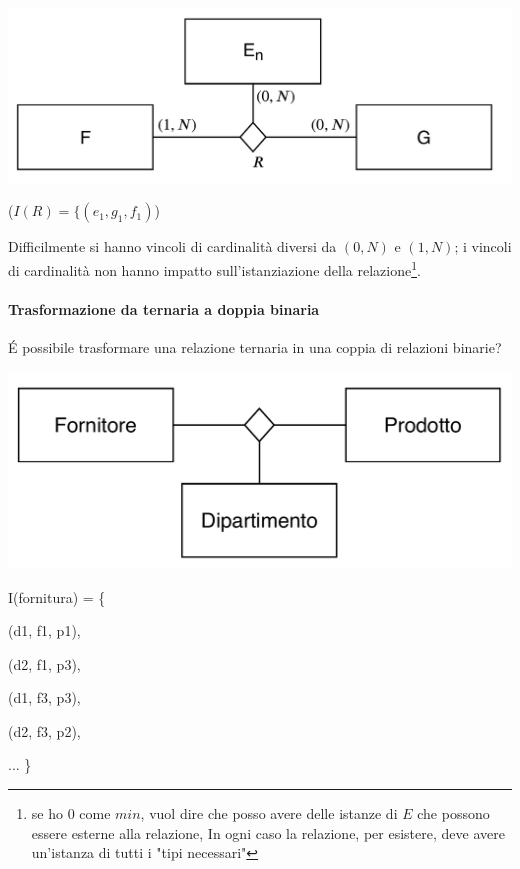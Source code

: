 \documentclass[a4paper, 10pt]{report}
\begin{document}
\begin{center}
\includegraphics[scale=0.5]{21ottobre08.pdf}

($I(R) = \{(e_1, g_1, f_1)$)
\end{center}

\noindent Difficilmente si hanno vincoli di cardinalità diversi da $(0, N)$ e $(1, N)$; i vincoli di cardinalità non hanno impatto sull'istanziazione della relazione\footnote{se ho $0$
come $min$, vuol dire che posso avere delle istanze di $E$ che possono essere esterne alla relazione, In ogni caso la relazione, per esistere, deve avere un'istanza di tutti i "tipi necessari"}. \\

\paragraph*{Trasformazione da ternaria a doppia binaria} É possibile trasformare una relazione ternaria in una coppia di relazioni binarie?

  \begin{center}
    \includegraphics[scale=0.5]{21ottobre09.pdf}
    
    
I(fornitura) = \{

(d1, f1, p1), 

(d2, f1, p3), 

(d1, f3, p3), 

(d2, f3, p2), 

...
\}
  \end{center}
\end{document}
